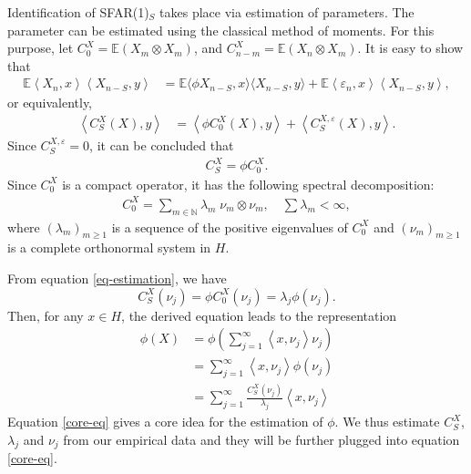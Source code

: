 \documentclass[11pt,a4paper]{article}
\numberwithin{equation}{section}
\newcommand{\E}{\mathbb{E}}
\begin{document}
Identification of SFAR(1)$_S$ takes place via estimation of parameters. The parameter can be estimated using the classical method of moments. For this purpose, let $C_0^X=\E\left({X_{m}\otimes X_{m}}\right)$, and $C_{n-m}^X=\E\left({X_n\otimes X_m}\right)$. It is easy to show that
\begin{align*}
  \E\left\langle X_{n},x\right\rangle\left\langle X_{n-S},y\right\rangle
    & = \E\langle\phi X_{n-S},x\rangle \langle X_{n-S},y \rangle
    + \E\left\langle\varepsilon_{n},x\right\rangle\left\langle  X_{n-S},y\right\rangle,
\end{align*}
or equivalently,
\begin{align*}
  \left\langle C_S^X(X),y\right\rangle
    & = \left\langle \phi C_0^X(X),y\right\rangle+\left\langle C_S^{X,\varepsilon}(X),y\right\rangle.
\end{align*}
Since $C_S^{X,\varepsilon}=0$, it can be concluded that
\begin{align}\label{eq-estimation}
  C_S^X=\phi C_0^X.
\end{align}
Since $C_0^X$ is a compact operator, it has the following spectral decomposition:
\begin{align}\label{eq-C}
  C_0^X=\sum_{m\in\mathbb{N}}\lambda_{m}\;\nu_{m}\otimes \nu_m,\quad\sum\lambda_{m}<\infty,
\end{align}
where $\left(\lambda_{m}\right)_{m\geqslant 1}$ is a sequence of the positive eigenvalues of $C_0^X$ and $\left(\nu_{m}\right)_{m\geqslant 1}$ is a complete orthonormal system in $H.$

From equation \eqref{eq-estimation}, we have
$$
  C_S^X\left(\nu_{j}\right)=\phi C_0^X\left(\nu_{j}\right)=\lambda_{j}\phi\left(\nu_{j}\right).
$$
Then, for any $x\in H$, the derived equation leads to the representation
\begin{align}\label{core-eq}
  \phi(X)
    & = \phi\left(\sum_{j=1}^\infty \left\langle x,\nu_j\right\rangle \nu_j\right)\nonumber \\
    & = \sum_{j=1}^\infty \left\langle x,\nu_j\right\rangle \phi\left(\nu_j\right)\nonumber \\
    & = \sum_{j=1}^\infty\frac{C_S^X\left(\nu_{j}\right)}{\lambda_j} \left\langle x,\nu_j\right\rangle
\end{align}
Equation \eqref{core-eq} gives a core idea for the estimation of $\phi$. We thus estimate $C_S^X$, $\lambda_{j}$ and $\nu_{j}$  from our empirical data and they will be further plugged into equation \eqref{core-eq}.
\end{document}
